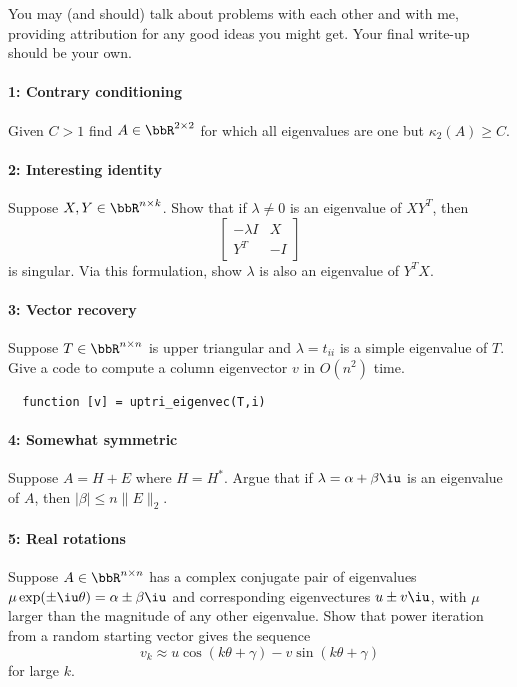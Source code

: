 \documentclass[12pt, leqno]{article} %
\begin{document}

You may (and should) talk about problems with each other and with me,
providing attribution for any good ideas you might get.  Your final
write-up should be your own.

\paragraph*{1: Contrary conditioning}
Given $C > 1$ find $A \in \bbR^{2 \times 2}$ for which all
eigenvalues are one but $\kappa_2(A) \geq C$.

\paragraph*{2: Interesting identity}
Suppose $X, Y \in \bbR^{n \times k}$.  Show that if $\lambda \neq 0$
is an eigenvalue of $XY^T$, then
\[
  \begin{bmatrix}
    -\lambda I & X \\
    Y^T & -I
  \end{bmatrix}
\]
is singular.  Via this formulation, show $\lambda$ is also an
eigenvalue of $Y^T X$.

\paragraph*{3: Vector recovery}
Suppose $T \in \bbR^{n \times n}$ is upper triangular and
$\lambda = t_{ii}$ is a simple eigenvalue of $T$.  Give a code
to compute a column eigenvector $v$ in $O(n^2)$ time.
\begin{lstlisting}
  function [v] = uptri_eigenvec(T,i)
\end{lstlisting}

\paragraph*{4: Somewhat symmetric}
Suppose $A = H + E$ where $H=H^*$.  Argue that if
$\lambda = \alpha+\beta \iu$ is an eigenvalue of $A$,
then $|\beta| \leq n \|E\|_2$.

\paragraph*{5: Real rotations}
Suppose $A \in \bbR^{n \times n}$ has a complex conjugate pair
of eigenvalues $\mu \exp(\pm \iu \theta) = \alpha \pm \beta \iu$
and corresponding eigenvectures $u \pm v\iu$,
with $\mu$ larger than the magnitude of any other eigenvalue.
Show that power iteration from a random starting vector gives the sequence
\[
  v_k \approx u \cos(k\theta + \gamma) - v \sin(k\theta + \gamma)
\]
for large $k$.
\end{document}

